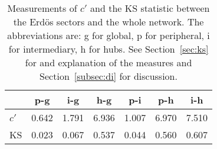 \begin{table}[h!]
\begin{center}
\begin{tabular}{| l | c | c | c | c | c | c |}\hline
 & p-g & i-g & h-g & p-i & p-h & i-h \\\hline
$c'$ & 0.642  & 1.791  & 6.936  & 1.007  & 6.970  & 7.510 \\\hline
KS & 0.023  & 0.067  & 0.537  & 0.044  & 0.560  & 0.607 \\\hline
\end{tabular}
\caption{Measurements of $c'$ and the KS statistic between the Erd\"os sectors and the whole network. The abbreviations are: g for global, p for peripheral, i for intermediary, h for hubs. See Section~\ref{sec:ks} for and explanation of the measures and Section~\ref{subsec:di} for discussion.}
\end{center}
\end{table}